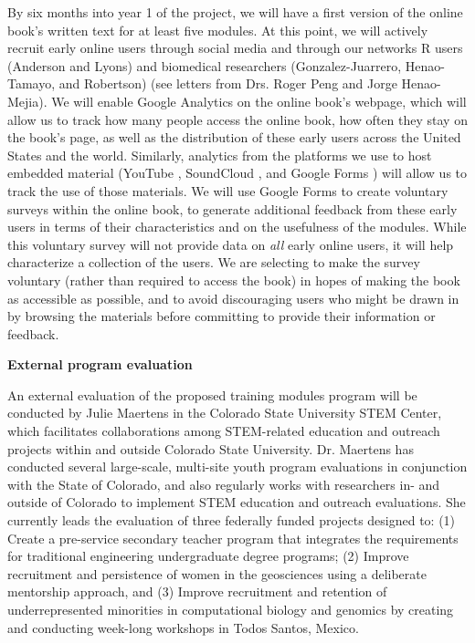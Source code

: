 \documentclass[pdftex,english,11.5pt,parskip=half]{scrartcl}
\begin{document}
By six months into year 1 of the project, we will 
have a first version of the online book's written text for at least five 
modules. At this point, we will actively recruit early online users through
social media and through our networks R users (Anderson and Lyons) and biomedical researchers (Gonzalez-Juarrero, Henao-Tamayo, and Robertson) (see letters from Drs. Roger Peng and Jorge Henao-Mejia). We will enable Google Analytics \cite{googleanalytics} on the online book's webpage, which will allow us to track how many people 
access the online book, how often they stay on the book's page, as well as the distribution of these early users across the United States and the world. 
Similarly, analytics from the platforms we use to host embedded material (YouTube \cite{youtube},
SoundCloud \cite{soundcloud}, and Google Forms \cite{googleforms}) will allow us to track the use of those materials.
We will use Google Forms \cite{googleforms} to create voluntary surveys within the online book, to generate additional feedback from these early users in terms of their characteristics and on the usefulness of the modules.  While this voluntary survey will not provide data on \textit{all} early online users, it will help characterize a collection of the users. We are selecting to make the survey voluntary (rather than required to access the book) in hopes of making the book as accessible as possible, and to avoid discouraging users who might be drawn in by browsing the materials before committing to provide their information or feedback.

\textbf{External program evaluation}

An external evaluation of the proposed training modules program will be conducted by Julie Maertens in the Colorado State University STEM Center, which facilitates collaborations among STEM-related education and outreach projects within and outside Colorado State University. Dr. Maertens has conducted several large-scale, multi-site youth program evaluations in conjunction with the State of Colorado, and also regularly works with researchers in- and outside of Colorado to implement STEM education and outreach evaluations. She currently leads the evaluation of three federally funded projects designed to: (1) Create a pre-service secondary teacher program that integrates the requirements for traditional engineering undergraduate degree programs; (2) Improve recruitment and persistence of women in the geosciences using a deliberate mentorship approach, and (3) Improve recruitment and retention of underrepresented minorities in computational biology and genomics by creating and conducting week-long workshops in Todos Santos, Mexico.
\end{document}
